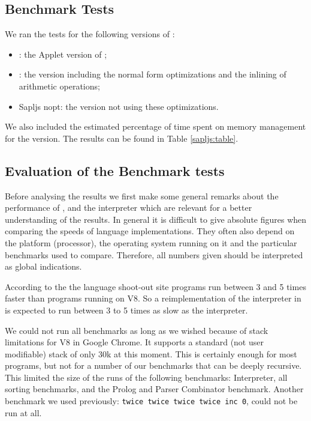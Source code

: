 \subsection{Benchmark Tests}
We ran the tests for the following versions of \Sapl: 
\begin{itemize}
\item{\Sapl}: the \Java Applet version of \Sapl;
\item{\Sapljs}: the \Sapljs version including the normal form optimizations and the inlining of arithmetic operations;
\item{\textsf{Sapljs nopt}}: the version not using these optimizations.
\end{itemize}
We also  included the estimated percentage of time spent on memory management for the \Sapljs version.
The results can be found in Table \ref{sapljs:table}.


\subsection{Evaluation of the Benchmark tests}
Before analysing the results we first make some general remarks about the performance of \Java, \JS and the \Sapl interpreter which are relevant for
a better understanding of the results. In general it is difficult to give absolute figures when comparing the speeds of language implementations. 
They often also depend on the platform (processor), the operating system running on it and the particular benchmarks used to compare. 
Therefore, all numbers given should be interpreted as global indications. 

According to the the language shoot-out site \cite{SHOOTOUT} \Java 
programs run between 3 and 5 times faster than \JS programs running on V8. 
So a reimplementation of the \Sapl interpreter in \JS is expected to run between 3 to 5 times as slow as the \Sapl interpreter.

We could not run all benchmarks as long as we wished because of stack limitations for V8 \JS in Google Chrome. 
It supports a standard (not user modifiable) stack of only 30k at this moment.
This is certainly enough for most \JS programs, but not for a number of our benchmarks that can be deeply recursive. 
This limited the size of the runs of the following benchmarks: \textsf{Interpreter}, all sorting benchmarks, and the \textsf{Prolog} and \textsf{Parser Combinator} benchmark. 
Another benchmark we used previously: \texttt{twice twice twice twice inc 0}, could not be run at all.

